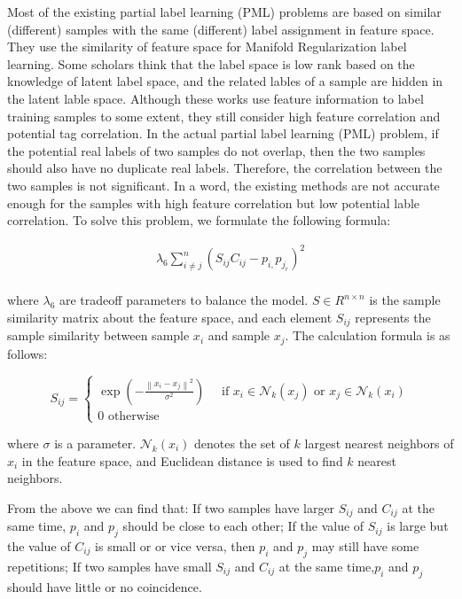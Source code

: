 \documentclass[final,3p,times]{elsarticle}
\begin{document}
Most of the existing partial label learning (PML) problems are based on similar (different) samples with the same (different) label assignment in feature space. They use the similarity of feature space for Manifold Regularization label learning. Some scholars think that the label space is low rank based on the knowledge of latent label space, and the related lables of a sample are hidden in the latent lable space. Although these works use feature information to label training samples to some extent, they still consider high feature correlation and potential tag correlation. In the actual partial label learning (PML) problem, if the potential real labels of two samples do not overlap, then the two samples should also have no duplicate real labels. Therefore, the correlation between the two samples is not significant. In a word, the existing methods are not accurate enough for the samples with high feature correlation but low potential lable correlation. To solve this problem, we formulate the following formula:

\begin{equation}
	\begin{array}{l}
		\lambda_{6}\sum_{i \neq j}^{n}\left(S_{i j} C_{i j}-p_{i,} p_{j_{r}}\right)^{2} \\
	\end{array}
\end{equation}

\noindent where $\lambda_{6}$ are tradeoff parameters to balance the model. $S\in R^{n \times n}$ is the sample similarity matrix about the feature space, and each element $S_{ij}$ represents the sample similarity between sample $x_{i}$ and sample $x_{j}$. The calculation formula is as follows:

\begin{equation}
	S_{i j}=\left\{\begin{array}{c}
		\exp \left(-\frac{\left\|x_{i}-x_{j}\right\|^{2}}{\sigma^{2}}\right) \quad \text { if } x_{i} \in \mathcal{N}_{k}\left(x_{j}\right) \text { or } x_{j} \in \mathcal{N}_{k}\left(x_{i}\right) \\
		0 \text { otherwise }
	\end{array}\right.
\end{equation}

\noindent where $\sigma$ is a parameter. $\mathcal{N}_{k}\left(x_{i}\right)$ denotes the set of $k$ largest nearest neighbors of $x_{i}$ in the feature space, and Euclidean distance is used to find $k$ nearest neighbors.

From the above we can find that: If two samples have larger $S_{ij}$ and $C_{ij}$ at the same time, $p_{i}$ and $p_{j}$ should be close to each other; If the value of $S_{ij}$ is large but the value of $C_{ij}$ is small or or vice versa, then $p_{i}$ and $p_{j}$ may still have some repetitions; If two samples have small $S_{ij}$ and $C_{ij}$ at the same time,$p_{i}$ and $p_{j}$ should have little or no coincidence. 
\end{document}
